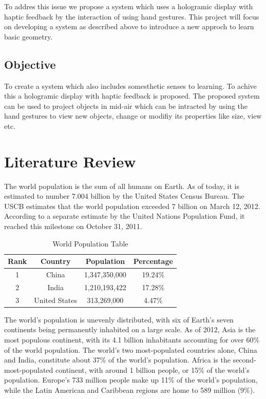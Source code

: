 \documentclass{fisatproject}
\begin{document}
\par To addres this issue  we propose a system which uses a hologramic display with haptic feedback by the interaction of using hand gestures. This project will focus on developing a system as described above to introduce a new approch to learn basic geometry.

\section{Objective}

To create a system which also includes somesthetic senses to learning. To achive this a hologramic display with haptic feedback is proposed. The proposed system can be used to project objects in mid-air which can be intracted by using the hand gestures to view new objects, change or modifiy its properties like size, view etc.

\chapter{Literature Review}

The world population is the sum of all humans on Earth. As of today, it is estimated to number 7.004 billion by the United States Census Bureau. The USCB estimates that the world population exceeded 7 billion on March 12, 2012. According to a separate estimate by the United Nations Population Fund, it reached this milestone on October 31, 2011.
\begin{table}[h!]
\begin{center}
\begin{tabular}{|c|c|c|c|}
\hline Rank & Country & Population  & Percentage  \\ 
\hline 1 & China & 1,347,350,000 & 19.24\% \\ 
\hline 2 & India & 1,210,193,422  & 17.28\% \\ 
\hline 3 & United States & 313,269,000 & 4.47\% \\ 
\hline 
\end{tabular}
\caption{World Population Table} 
\end{center}
\end{table}
The world's population is unevenly distributed, with six of Earth's seven continents being permanently inhabited on a large scale. As of 2012, Asia is the most populous continent, with its 4.1 billion inhabitants accounting for over 60\% of the world population. The world's two most-populated countries alone, China and India, constitute about 37\% of the world's population. Africa is the second-most-populated continent, with around 1 billion people, or 15\% of the world's population. Europe's 733 million people make up 11\% of the world's population, while the Latin American and Caribbean regions are home to 589 million (9\%).
\end{document}
